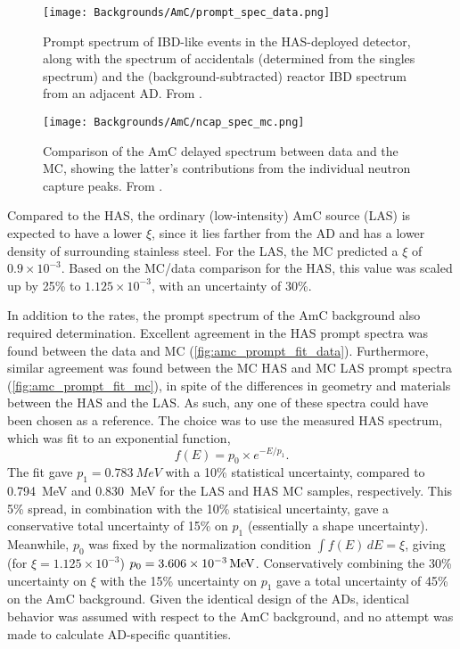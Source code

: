 \documentclass[../thesis.tex]{subfiles}
\begin{document}
\begin{figure}[ht]
  \texttt{[image: Backgrounds/AmC/prompt\_spec\_data.png]}
  \caption{Prompt spectrum of IBD-like events in the HAS-deployed detector, along with the spectrum of accidentals (determined from the singles spectrum) and the (background-subtracted) reactor IBD spectrum from an adjacent AD. From \cite{Gu_2016}.}
  \label{fig:amc_prompt_spec_data}
\end{figure}

\begin{figure}[ht]
  \texttt{[image: Backgrounds/AmC/ncap\_spec\_mc.png]}
  \caption{Comparison of the AmC delayed spectrum between data and the MC, showing the latter's contributions from the individual neutron capture peaks. From \cite{Gu_2016}.}
  \label{fig:amc_ncap_spec_mc}
\end{figure}

Compared to the HAS, the ordinary (low-intensity) AmC source (LAS) is expected to have a lower $\xi$, since it lies farther from the AD and has a lower density of surrounding stainless steel. For the LAS, the MC predicted a $\xi$ of $0.9\times10^{-3}$. Based on the MC/data comparison for the HAS, this value was scaled up by 25\% to $1.125\times10^{-3}$, with an uncertainty of 30\%. 

In addition to the rates, the prompt spectrum of the AmC background also required determination. Excellent agreement in the HAS prompt spectra was found between the data and MC (\autoref{fig:amc_prompt_fit_data}). Furthermore, similar agreement was found between the MC HAS and MC LAS prompt spectra (\autoref{fig:amc_prompt_fit_mc}), in spite of the differences in geometry and materials between the HAS and the LAS. As such, any one of these spectra could have been chosen as a reference. The choice was to use the measured HAS spectrum, which was fit to an exponential function,
\begin{equation}
  f(E) = p_0 \times e^{-E/p_1}.
  \label{eq:amc_fit_func}
\end{equation}
The fit gave $p_1 = \SI{0.783}{MeV}$ with a 10\% statistical uncertainty, compared to \SI{0.794}{MeV} and \SI{0.830}{MeV} for the LAS and HAS MC samples, respectively. This 5\% spread, in combination with the 10\% statisical uncertainty, gave a conservative total uncertainty of 15\% on $p_1$ (essentially a shape uncertainty). Meanwhile, $p_0$ was fixed by the normalization condition $\int f(E)\,dE = \xi$, giving (for $\xi = 1.125\times10^{-3}$) $p_0 = \SI[parse-numbers = false]{3.606\times10^{-3}}{/MeV}$. Conservatively combining the 30\% uncertainty on $\xi$ with the 15\% uncertainty on $p_1$ gave a total uncertainty of 45\% on the AmC background. Given the identical design of the ADs, identical behavior was assumed with respect to the AmC background, and no attempt was made to calculate AD-specific quantities.
\end{document}

